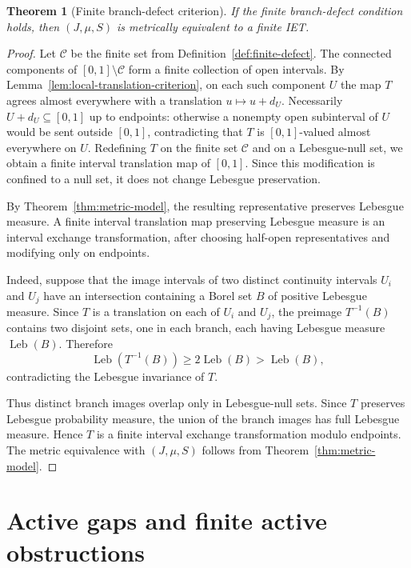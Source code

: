 \documentclass[11pt]{amsart}
\theoremstyle{plain}
\newtheorem{theorem}{Theorem}[section]
\theoremstyle{definition}
\theoremstyle{remark}
\newcommand{\cC}{\mathcal C}
\begin{document}
\begin{theorem}[Finite branch-defect criterion]\label{thm:finite-defect}
If the finite branch-defect condition holds, then $(J,\mu,S)$ is metrically equivalent to a finite IET.
\end{theorem}

\begin{proof}
Let $\cC$ be the finite set from Definition~\ref{def:finite-defect}. The connected
components of $[0,1]\setminus\cC$ form a finite collection of open intervals. By
Lemma~\ref{lem:local-translation-criterion}, on each such component \(U\) the map \(T\)
agrees almost everywhere with a translation \(u\mapsto u+d_U\). Necessarily
\(U+d_U\subseteq[0,1]\) up to endpoints: otherwise a nonempty open subinterval of \(U\)
would be sent outside \([0,1]\), contradicting that \(T\) is \([0,1]\)-valued almost
everywhere on \(U\). Redefining \(T\) on the finite set \(\cC\) and on a Lebesgue-null
set, we obtain a finite interval translation map of \([0,1]\). Since this modification is
confined to a null set, it does not change Lebesgue preservation.

By Theorem~\ref{thm:metric-model}, the resulting representative preserves Lebesgue
measure. A finite interval translation map preserving Lebesgue measure is an
interval exchange transformation, after choosing half-open
representatives and modifying only on endpoints.

Indeed, suppose that the image intervals of two distinct continuity
intervals \(U_i\) and \(U_j\) have an intersection containing a Borel
set \(B\) of positive Lebesgue measure. Since \(T\) is a translation on
each of \(U_i\) and \(U_j\), the preimage \(T^{-1}(B)\) contains two
disjoint sets, one in each branch, each having Lebesgue measure
\(\operatorname{Leb}(B)\). Therefore
\[
        \operatorname{Leb}(T^{-1}(B))
        \geq
        2\operatorname{Leb}(B)
        >
        \operatorname{Leb}(B),
\]
contradicting the Lebesgue invariance of \(T\).

Thus distinct branch images overlap only in Lebesgue-null sets. Since
\(T\) preserves Lebesgue probability measure, the union of the branch
images has full Lebesgue measure. Hence \(T\) is a finite interval
exchange transformation modulo endpoints. The metric equivalence with
\((J,\mu,S)\) follows from Theorem~\ref{thm:metric-model}.
\end{proof}

\section{Active gaps and finite active obstructions}
\end{document}
